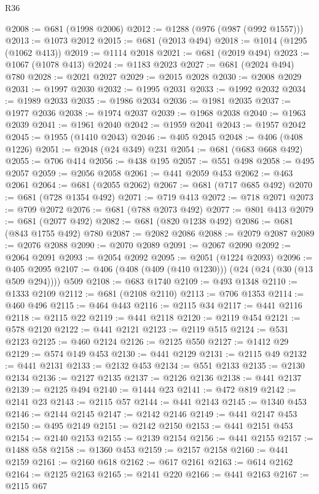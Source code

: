 \begin{lexlean}{R36}
\begin{coremodule}
{{{{{{{{{{{{{{{{{{{{{{{{{{{{{{{{{{{{{{{{{{{{{{{{{{{{{{{{{{{{{{{{{{{{{{{{{{{{{{{{{{@2008 := @681 (@1998 @2006)
@2012 := @1288 (@976 (@987 (@992 @1557)))
@2013 := @1073 @2012
@2015 := @681 (@2013 @494)
@2018 := @1014 (@1295 (@1062 @413))
@2019 := @1114 @2018
@2021 := @681 (@2019 @494)
@2023 := @1067 (@1078 @413)
@2024 := @1183 @2023
@2027 := @681 (@2024 @494) @780
@2028 := @2021 @2027
@2029 := @2015 @2028
@2030 := @2008 @2029
@2031 := @1997 @2030
@2032 := @1995 @2031
@2033 := @1992 @2032
@2034 := @1989 @2033
@2035 := @1986 @2034
@2036 := @1981 @2035
@2037 := @1977 @2036
@2038 := @1974 @2037
@2039 := @1968 @2038
@2040 := @1963 @2039
@2041 := @1961 @2040
@2042 := @1959 @2041
@2043 := @1957 @2042
@2045 := @1955 (@1410 @2043)
@2046 := @405 @2045
@2048 := @406 (@408 @1226)
@2051 := @2048 (@24 @349) @231
@2054 := @681 (@683 @668 @492)
@2055 := @706 @414
@2056 := @438 @195
@2057 := @551 @498
@2058 := @495 @2057
@2059 := @2056 @2058
@2061 := @441 @2059 @453
@2062 := @463 @2061
@2064 := @681 (@2055 @2062)
@2067 := @681 (@717 @685 @492)
@2070 := @681 (@728 @1354 @492)
@2071 := @719 @413
@2072 := @718 @2071
@2073 := @709 @2072
@2076 := @681 (@788 @2073 @492)
@2077 := @801 @413
@2079 := @681 (@2077 @492)
@2082 := @681 (@820 @1238 @492)
@2086 := @681 (@843 @1755 @492) @780
@2087 := @2082 @2086
@2088 := @2079 @2087
@2089 := @2076 @2088
@2090 := @2070 @2089
@2091 := @2067 @2090
@2092 := @2064 @2091
@2093 := @2054 @2092
@2095 := @2051 (@1224 @2093)
@2096 := @405 @2095
@2107 := @406 (@408 (@409 (@410 @1230))) (@24 (@24 (@30 (@13 @509 @294)))) @509
@2108 := @683 @1740
@2109 := @493 @1348
@2110 := @1333 @2109
@2112 := @681 (@2108 @2110)
@2113 := @706 @1353
@2114 := @460 @496
@2115 := @464 @443
@2116 := @2115 @34
@2117 := @441 @2116
@2118 := @2115 @22
@2119 := @441 @2118
@2120 := @2119 @454
@2121 := @578 @2120
@2122 := @441 @2121
@2123 := @2119 @515
@2124 := @531 @2123
@2125 := @460 @2124
@2126 := @2125 @550
@2127 := @1412 @29
@2129 := @574 @149 @453
@2130 := @441 @2129
@2131 := @2115 @49
@2132 := @441 @2131
@2133 := @2132 @453
@2134 := @551 @2133
@2135 := @2130 @2134
@2136 := @2127 @2135
@2137 := @2126 @2136
@2138 := @441 @2137
@2139 := @2125 @494
@2140 := @1444 @23
@2141 := @472 @819
@2142 := @2141 @23
@2143 := @2115 @57
@2144 := @441 @2143
@2145 := @1340 @453
@2146 := @2144 @2145
@2147 := @2142 @2146
@2149 := @441 @2147 @453
@2150 := @495 @2149
@2151 := @2142 @2150
@2153 := @441 @2151 @453
@2154 := @2140 @2153
@2155 := @2139 @2154
@2156 := @441 @2155
@2157 := @1488 @58
@2158 := @1360 @453
@2159 := @2157 @2158
@2160 := @441 @2159
@2161 := @2160 @618
@2162 := @617 @2161
@2163 := @614 @2162
@2164 := @2125 @2163
@2165 := @2141 @220
@2166 := @441 @2163
@2167 := @2115 @67
}}}}}}}}}}}}}}}}}}}}}}}}}}}}}}}}}}}}}}}}}}}}}}}}}}}}}}}}}}}}}}}}}}}}}}}}}}}}}}}}}}
\end{coremodule}
\end{lexlean}
